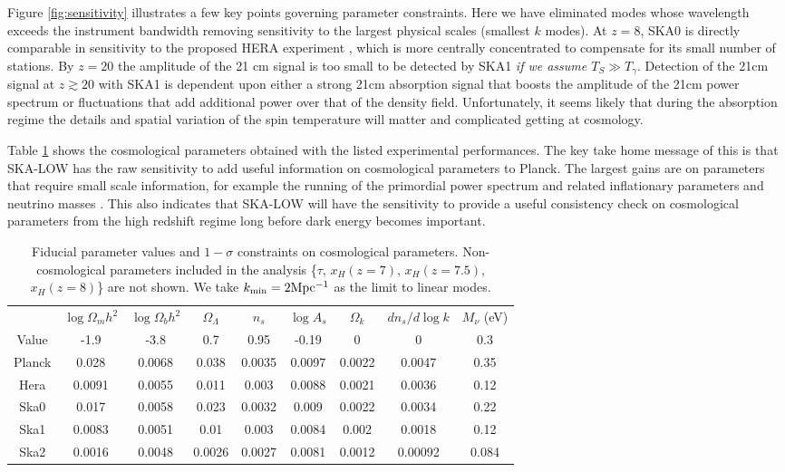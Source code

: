 \documentclass{PoS}
\begin{document}
Figure \ref{fig:sensitivity} illustrates a few key points governing parameter constraints. Here we have eliminated modes whose wavelength exceeds the instrument bandwidth removing sensitivity to the largest physical scales (smallest $k$ modes). At $z=8$, SKA0 is directly comparable in sensitivity to the proposed HERA experiment \citep{2014ApJ...782...66P}, which is more centrally concentrated to compensate for its small number of stations. By $z=20$ the amplitude of the 21 cm signal is too small to be detected by SKA1 {\em if we assume $T_S\gg T_\gamma$}. Detection of the 21cm signal at $z\gtrsim20$ with SKA1 is dependent upon either a strong 21cm absorption signal that boosts the amplitude of the 21cm power spectrum or fluctuations that add additional power over that of the density field. Unfortunately, it seems likely that during the absorption regime the details and spatial variation of the spin temperature will matter and complicated getting at cosmology.

Table \ref{tab:constraints} shows the cosmological parameters obtained with the listed experimental performances. The key take home message of this is that SKA-LOW has the raw sensitivity to add useful information on cosmological parameters to Planck. The largest gains are on parameters that require small scale information, for example the running of the primordial power spectrum and related inflationary parameters \citep{2009PhLB..673..173B,2011JCAP...02..021A} and neutrino masses \citep{2008PhRvD..78f5009P}. This also indicates that SKA-LOW will have the sensitivity to provide a useful consistency check on cosmological parameters from the high redshift regime long before dark energy becomes important.

\begin{table}[htdp]
\caption{Fiducial parameter values and $1-\sigma$ constraints on cosmological parameters. Non-cosmological parameters included in the analysis \{$\tau$, $x_H(z=7)$, $x_H(z=7.5)$, $x_H(z=8)$\} are not shown. We take $k_{\rm min}=2{\rm Mpc^{-1}}$ as the limit to linear modes.}
\begin{center}
\begin{tabular}{c|cccccccc}
\hline
 & $\log\Omega_mh^2$ & $\log\Omega_bh^2$ & $\Omega_\Lambda$ & $n_s$ & $\log A_s$ & $\Omega_k$ & $dn_s/d\log k$ & $M_\nu$ (eV) \\
Value & -1.9 & -3.8 & 0.7 & 0.95 & -0.19 & 0 & 0 & 0.3\\
\hline
Planck & 0.028 & 0.0068 & 0.038 & 0.0035 & 0.0097 & 0.0022 & 0.0047 & 0.35 \\
Hera & 0.0091 & 0.0055 & 0.011 & 0.003 & 0.0088 & 0.0021 & 0.0036 & 0.12  \\
Ska0 & 0.017 & 0.0058 & 0.023 & 0.0032 & 0.009 & 0.0022 & 0.0034 & 0.22  \\
Ska1 & 0.0083 & 0.0051 & 0.01 & 0.003 & 0.0084 & 0.002 & 0.0018 & 0.12  \\
Ska2 & 0.0016 & 0.0048 & 0.0026 & 0.0027 & 0.0081 & 0.0012 & 0.00092 & 0.084 
\end{tabular}
\end{center}
\label{tab:constraints}
\end{table}
\end{document}
